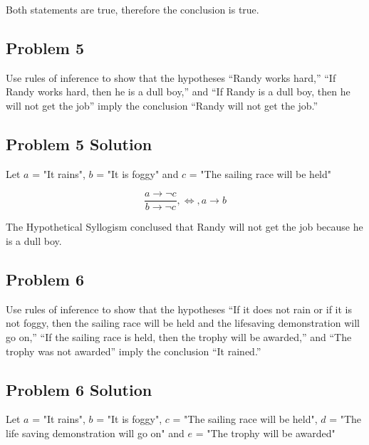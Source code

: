 \documentclass[11pt]{article}
\begin{document}
Both statements are true, therefore the conclusion is true.

\subsection{Problem 5}

Use rules of inference to show that the hypotheses “Randy works hard,” “If Randy works hard, then he is a dull boy,” and “If Randy is a dull boy, then he will not get the job” imply the conclusion “Randy will not get the job.”

\subsection{Problem 5 Solution}

Let $a$ = "It rains", $b$ = "It is foggy" and $c$ = "The sailing race will be held"

\begin{displaymath}
	\frac{a \to \lnot c}{b \to \lnot c}, \iff, a \to b
\end{displaymath}

The Hypothetical Syllogism conclused that Randy will not get the job because he is a dull boy.

\subsection{Problem 6}

Use rules of inference to show that the hypotheses “If it does not rain or if it is not foggy, then the sailing race will be held and the lifesaving demonstration will go on,” “If the sailing race is held, then the trophy will be awarded,” and “The trophy was not awarded” imply the conclusion “It rained.”

\subsection{Problem 6 Solution}

Let $a$ = "It rains", $b$ = "It is foggy", $c$ = "The sailing race will be held", $d$ = "The life saving demonstration will go on" and $e$ = "The trophy will be awarded"
\end{document}
